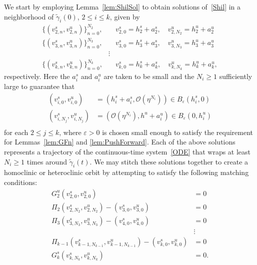 \documentclass[11pt]{article}
\numberwithin{equation}{section}
\theoremstyle{plain}
\begin{document}
We start by employing Lemma~\ref{lem:ShilSol} to obtain solutions of~\eqref{Shil} in a neighborhood of $\tilde\gamma_i(0)$, $2 \leq i \leq k$, given by
\begin{equation}
	\begin{split}
		\{(v^s_{2,n},v^u_{2,n})\}_{n = 0}^{N_2},& \quad v^s_{2,0} = h^s_2 +a^s_2, \quad v^u_{2,N_2}= h^u_2 +a^u_2 \\
		\{(v^s_{3,n},v^u_{3,n})\}_{n = 0}^{N_3},& \quad v^s_{3,0} = h^s_3 +a^s_3, \quad v^u_{3,N_3}= h^u_3 +a^u_3 \\
		&\vdots \\
		\{(v^s_{k,n},v^u_{k,n})\}_{n = 0}^{N_{k}},& \quad v^s_{k,0} = h^s_k +a^s_{k}, \quad v^u_{k,N_{k}}= h^u_k +a^u_{k},
	\end{split}	
\end{equation} 
respectively. Here the $a^s_i$ and $a^u_i$ are taken to be small and the $N_i \geq 1$ sufficiently large to guarantee that 
\begin{equation}\label{Expansions}
	\begin{split}
		(v^s_{i,0},v^u_{i,0}) &= (h^s_i+a_i^s,\mathcal{O}(\eta^{N_i})) \in B_\varepsilon(h^s_i,0) \\
		(v^s_{i,N_j},v^u_{i,N_j}) &= (\mathcal{O}(\eta^{N_i}),h^u+a_i^u) \in B_\varepsilon(0,h^u_i) \\
	\end{split}
\end{equation} 
for each $2 \leq j \leq k$, where $\varepsilon > 0$ is chosen small enough to satisfy the requirement for Lemmas~\ref{lem:GFn} and \ref{lem:PushForward}. Each of the above solutions represents a trajectory of the continuous-time system~\eqref{ODE} that wraps at least $N_i \geq 1$ times around $\tilde\gamma_i(t)$. We may stitch these solutions together to create a homoclinic or heteroclinic orbit by attempting to satisfy the following matching conditions:
\begin{equation}\label{HomMatch}
	\begin{split}
		G^u_2(v^s_{2,0},v^u_{2,0}) &= 0 \\
		\Pi_2(v^s_{2,N_2},v^u_{2,N_2}) - (v^s_{3,0},v^u_{3,0}) &= 0 \\
		\Pi_3(v^s_{3,N_3},v^u_{3,N_3}) - (v^s_{4,0},v^u_{4,0}) &= 0 \\ 
		&\vdots \\
		\Pi_{k-1}(v^s_{k-1,N_{k-1}},v^u_{k-1,N_{k-1}}) - (v^s_{k,0},v^u_{k,0}) &= 0 \\
		G^s_k(v^s_{k,N_{k}},v^u_{k,N_{k}}) &= 0.
	\end{split}
\end{equation} 
\end{document}
